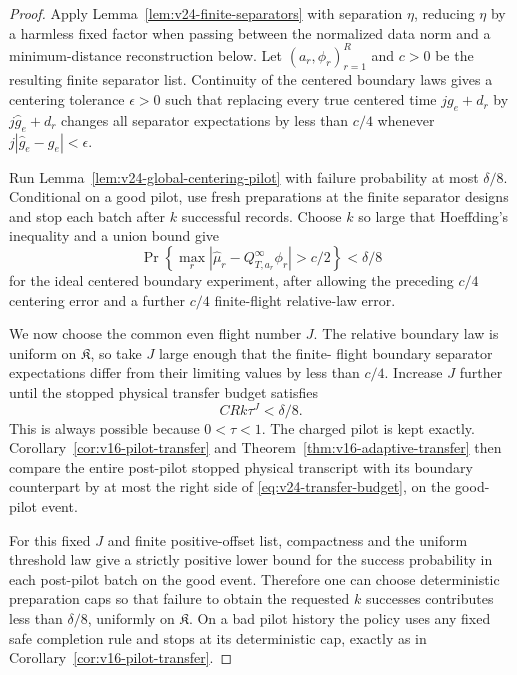 \begin{proof}
Apply Lemma~\ref{lem:v24-finite-separators} with separation \(\eta\), reducing
\(\eta\) by a harmless fixed factor when passing between the normalized data
norm and a minimum-distance reconstruction below.  Let
\((a_r,\phi_r)_{r=1}^R\) and \(c>0\) be the resulting finite separator list.
Continuity of the centered boundary laws gives a centering tolerance
\(\epsilon>0\) such that replacing every true centered time \(jg_e+d_r\) by
\(j\widehat g_e+d_r\) changes all separator expectations by less than
\(c/4\) whenever \(j|\widehat g_e-g_e|<\epsilon\).

Run Lemma~\ref{lem:v24-global-centering-pilot} with failure probability at
most \(\delta/8\).  Conditional on a good pilot, use fresh preparations at
the finite separator designs and stop each batch after \(k\) successful
records.  Choose \(k\) so large that Hoeffding's inequality and a union bound
give
\begin{equation}\label{eq:v24-empirical-separators}
 \Pr\left\{
  \max_r|\widehat\mu_r-Q_{T,a_r}^{\infty}\phi_r|>c/2
       \right\}<\delta/8
\end{equation}
for the ideal centered boundary experiment, after allowing the preceding
\(c/4\) centering error and a further \(c/4\) finite-flight relative-law
error.

We now choose the common even flight number \(J\).  The relative boundary law
is uniform on \(\mathfrak K\), so take \(J\) large enough that the finite-
flight boundary separator expectations differ from their limiting values by
less than \(c/4\).  Increase \(J\) further until the stopped physical transfer
budget satisfies
\begin{equation}\label{eq:v24-transfer-budget}
                         C R k\tau^J<\delta/8.
\end{equation}
This is always possible because \(0<\tau<1\).  The charged pilot is kept
exactly.  Corollary~\ref{cor:v16-pilot-transfer} and
Theorem~\ref{thm:v16-adaptive-transfer} then compare the entire post-pilot
stopped physical transcript with its boundary counterpart by at most the
right side of \eqref{eq:v24-transfer-budget}, on the good-pilot event.

For this fixed \(J\) and finite positive-offset list, compactness and the
uniform threshold law give a strictly positive lower bound for the success
probability in each post-pilot batch on the good event.  Therefore one can
choose deterministic preparation caps so that failure to obtain the requested
\(k\) successes contributes less than \(\delta/8\), uniformly on
\(\mathfrak K\).  On a bad pilot history the policy uses any fixed safe
completion rule and stops at its deterministic cap, exactly as in
Corollary~\ref{cor:v16-pilot-transfer}.


\end{proof}
